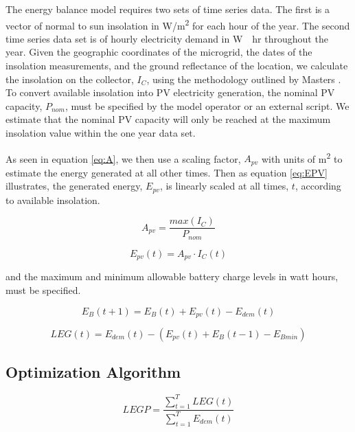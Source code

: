 \documentclass{article}
\begin{document}
The energy balance model requires two sets of time series data. 
The first is a vector of normal to sun insolation in \unit{W/m^2} for each hour of the year.
The second time series data set is of hourly electricity demand in \unit{W\cdot hr} throughout the year. 
Given the geographic coordinates of the microgrid, the dates of the insolation measurements, and the ground reflectance of the location, we calculate the insolation on the collector, $I_C$, using the methodology outlined by Masters \cite{}. 
To convert available insolation into PV electricity generation, the nominal PV capacity, $P_{nom}$, must be specified by the model operator or an external script.
We estimate that the nominal PV capacity will only be reached at the maximum insolation value within the one year data set.

As seen in equation \ref{eq:A}, we then use a scaling factor, $ A_{pv}$ with units of \unit{m^2} to estimate the energy generated at all other times. Then as equation \ref{eq:EPV} illustrates, the generated energy, $E_{pv}$, is linearly scaled at all times, $t$, according to available insolation. 


\begin{equation} \label{eq:A}
A_{pv} = \frac{max(I_C)}{P_{nom}}
\end{equation}

\begin{equation} \label{eq:EPV}
E_{pv}(t) = A_{pv} \cdot I_C(t)
\end{equation}


and the maximum and minimum allowable battery charge levels in watt hours, must be specified.


\begin{equation}
E_B (t+1) = E_B (t) + E_{pv} (t) - E_{dem} (t)
\end{equation}


\begin{equation}
LEG(t) = E_{dem} (t) - (E_{pv} (t)+E_B(t-1)-E_{Bmin})
\end{equation}


\subsection{Optimization Algorithm}



\begin{equation}
LEGP = \frac{\sum_{t=1}^T LEG(t)}{\sum_{t=1}^T E_{dem} (t)}
\end{equation}
\end{document}
